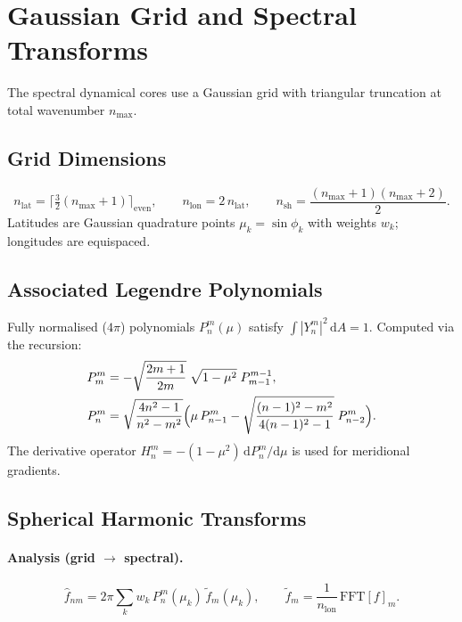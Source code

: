 \documentclass[11pt,twoside]{report}
\newcommand{\dd}{\mathrm{d}}
\begin{document}
\section{Gaussian Grid and Spectral Transforms}
\label{sec:spectral-grid}

The spectral dynamical cores use a Gaussian grid with triangular truncation
at total wavenumber $n_{\max}$.

\subsection{Grid Dimensions}
\begin{equation}
  n_{\mathrm{lat}} = \lceil\tfrac{3}{2}(n_{\max}+1)\rceil_{\mathrm{even}},
  \qquad n_{\mathrm{lon}} = 2\,n_{\mathrm{lat}},
  \qquad n_{\mathrm{sh}} = \frac{(n_{\max}+1)(n_{\max}+2)}{2}.
\end{equation}
Latitudes are Gaussian quadrature points $\mu_k=\sin\phi_k$ with weights
$w_k$; longitudes are equispaced.

\subsection{Associated Legendre Polynomials}

Fully normalised ($4\pi$) polynomials $P_n^m(\mu)$ satisfy
$\int|Y_n^m|^2\,\dd A=1$.  Computed via the recursion:
\begin{align}
  P_m^m &= -\sqrt{\frac{2m+1}{2m}}\;\sqrt{1-\mu^2}\;P_{m-1}^{m-1},\\
  P_n^m &= \sqrt{\frac{4n^2-1}{n^2-m^2}}
    \Bigl(\mu\,P_{n-1}^m -
    \sqrt{\frac{(n-1)^2-m^2}{4(n-1)^2-1}}\;P_{n-2}^m\Bigr).
\end{align}
The derivative operator $H_n^m=-(1-\mu^2)\,\dd P_n^m/\dd\mu$ is used for
meridional gradients.

\subsection{Spherical Harmonic Transforms}

\paragraph{Analysis (grid $\to$ spectral).}
\begin{equation}
  \hat f_{nm} = 2\pi\sum_k w_k\,P_n^m(\mu_k)\,\tilde f_m(\mu_k),
  \qquad \tilde f_m = \frac{1}{n_{\mathrm{lon}}}\,\mathrm{FFT}[f]_m.
\end{equation}
\end{document}
